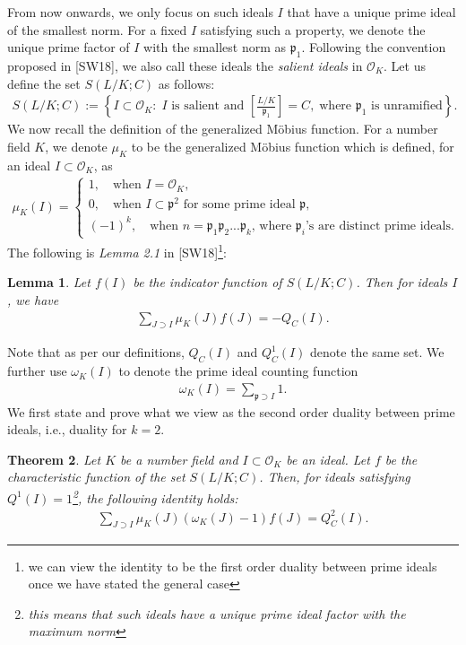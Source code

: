 \documentclass[12pt]{article}
\numberwithin{equation}{section}
\newtheorem{theorem}{Theorem}[section]
\newtheorem{lemma}[theorem]{Lemma}
\numberwithin{equation}{section}
\begin{document}
From now onwards, we only focus on such ideals $I$ that have a unique prime ideal of the smallest norm. For a fixed $I$ satisfying such a property, we denote the unique prime factor of $I$ with the smallest norm as $\mathfrak{p}_1$. Following the convention proposed in [SW18], we also call these ideals the \textit{salient ideals} in $\mathcal{O}_K$. Let us define the set $S(L/K;C)$ as follows: 
\begin{align}
     S(L/K;C):=\left\{I \subset \mathcal{O}_K:\;I\text{ is salient and }\left[\frac{L/K}{\mathfrak{p}_1}\right]=C,\;\text{where $\mathfrak{p}_1$ is unramified}\right\}. \nonumber
\end{align}
We now recall the definition of the generalized M\"obius function. For a number field $K$, we denote $\mu_K$ to be the generalized M\"obius function which is defined, for an ideal $I \subset \mathcal{O}_K$, as
\begin{align}
     \mu_K(I) = \begin{cases}
        1,\quad \text{when $I=\mathcal{O}_K$}, \\
        0,\quad \text{when $I \subset \mathfrak{p}^2$ for some prime ideal $\mathfrak{p}$}, \\
        (-1)^k,\quad \text{when $n=\mathfrak{p}_1\mathfrak{p}_2...\mathfrak{p}_k$, where $\mathfrak{p}_i$'s are distinct prime ideals.}
    \end{cases} \nonumber
\end{align}
The following is \textit{Lemma 2.1} in [SW18]\footnote[4]{we can view the identity to be the first order duality between prime ideals once we have stated the general case}:
\begin{lemma}
    Let $f(I)$ be the indicator function of $S(L/K;C)$. Then for ideals $I$, we have
    \begin{align}
        \sum_{J \supset I}\mu_K(J)f(J) = -Q_C(I). \nonumber 
    \end{align}
\end{lemma}
\noindent Note that as per our definitions, $Q_C(I)$ and $Q_C^1(I)$ denote the same set.
We further use $\omega_K(I)$ to denote the prime ideal counting function 
\begin{align}
    \omega_K(I) = \sum_{\mathfrak{p} \supset I} 1 .\nonumber 
\end{align}
We first state and prove what we view as the second order duality between prime ideals, i.e., duality for $k=2$. 
\begin{theorem}
    Let $K$ be a number field and $I \subset \mathcal{O}_K$ be an ideal. Let $f$ be the characteristic function of the set $S(L/K;C)$. Then, for ideals satisfying $Q^1(I)=1$\footnote[5]{this means that such ideals have a unique prime ideal factor with the maximum norm}, the following identity holds:
    \begin{align}
         \sum_{J \supset I} \mu_K(J)(\omega_K(J)-1)f(J) = Q_C^2(I). \nonumber
    \end{align}
\end{theorem}
\end{document}
